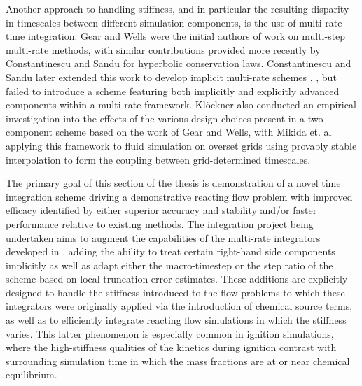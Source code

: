 Another approach to handling stiffness, and in particular the resulting disparity in
timescales between different simulation components, is the use of multi-rate
time integration. Gear and Wells \cite{gear1984multirate} were the initial authors of
work on multi-step multi-rate methods, with similar contributions provided more
recently by Constantinescu and Sandu \cite{constantinescu2007multirate} for hyperbolic
conservation laws. Constantinescu and Sandu later extended this work to develop implicit
multi-rate schemes \cite{constantinescu2010extrapolated},
\cite{constantinescu2013extrapolated}, but failed to introduce a scheme featuring both
implicitly and explicitly advanced components within a multi-rate framework. Kl\"{o}ckner
\cite{klockner2010high} also conducted an empirical investigation into the effects of the various design choices
present in a two-component scheme based on the work of Gear and Wells, with Mikida et. al
\cite{mikida2019multi} applying this framework to fluid simulation on overset grids using provably stable
interpolation to form the coupling between grid-determined timescales.


The primary goal of this section of the thesis is demonstration of a novel
time integration scheme driving a demonstrative reacting flow problem
with improved efficacy identified by either superior accuracy and stability and/or
faster performance relative to existing methods. The integration project
being undertaken aims to augment the capabilities of the multi-rate integrators
developed in \cite{mikida2019multi}, adding the ability to treat certain
right-hand side components implicitly as well as adapt either the macro-timestep
or the step ratio of the scheme based on local truncation error estimates. These
additions are explicitly designed to handle the stiffness introduced to the flow
problems to which these integrators were originally applied via the introduction
of chemical source terms, as well as to efficiently integrate reacting flow
simulations in which the stiffness varies. This latter phenomenon is especially
common in ignition simulations, where the high-stiffness qualities of the
kinetics during ignition contrast with surrounding simulation time in which
the mass fractions are at or near chemical equilibrium.

